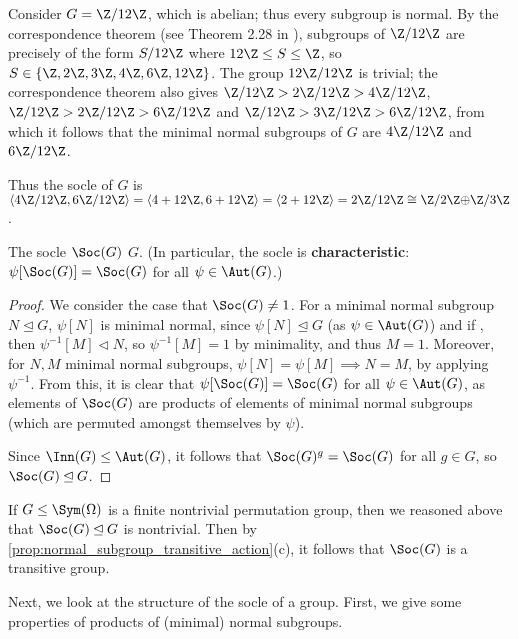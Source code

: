\begin{example}\label{eg:socle_Z_12}
    Consider $G = \Z/12\Z$, which is abelian; thus every subgroup is normal. By the correspondence theorem (see Theorem 2.28 in \cite{rotman_intro_theory_groups1995}), subgroups of $\Z/12\Z$ are precisely of the form $S/12\Z$ where $12\Z \leq S \leq \Z$, so $S \in \{\Z,2\Z,3\Z,4\Z,6\Z,12\Z\}$. The group $12\Z/12\Z$ is trivial; the correspondence theorem also gives $\Z/12\Z > 2\Z/12\Z > 4\Z/12\Z$, $\Z/12\Z > 2\Z/12\Z > 6\Z/12\Z$ and $\Z/12\Z > 3\Z/12\Z > 6\Z/12\Z$, from which it follows that the minimal normal subgroups of $G$ are $4\Z/12\Z$ and $6\Z/12\Z$.

    Thus the socle of $G$ is $\langle 4\Z/12\Z,6\Z/12\Z \rangle = \langle 4 + 12\Z,6 + 12\Z \rangle = \langle 2 + 12\Z \rangle = 2\Z/12\Z \cong \Z/2\Z \added{3}{\oplus} \Z/3\Z$.
\end{example}

\begin{lemma}\label{lem:socle_is_normal}
    The socle $\Soc(G)$  $G$. (In particular, the socle is \textbf{characteristic}: $\psi[\Soc(G)] = \Soc(G)$ for all $\psi \in \Aut(G)$.)
\end{lemma}

\begin{proof}
    We consider the case that $\Soc(G) \neq 1$. For a minimal normal subgroup $N \unlhd G$, $\psi[N]$ is minimal normal, since $\psi[N] \unlhd G$ (as $\psi \in \Aut(G)$) and if , then $\psi^{-1}[M] \lhd N$, so $\psi^{-1}[M] = 1$ by minimality, and thus $M = 1$. Moreover, for $N,M$ minimal normal subgroups, $\psi[N] = \psi[M] \implies N = M$, by applying $\psi^{-1}$. From this, it is clear that $\psi[\Soc(G)] = \Soc(G)$ for all $\psi \in \Aut(G)$, as elements of $\Soc(G)$ are products of elements of minimal normal subgroups (which are permuted amongst themselves by $\psi$).

    Since $\Inn(G) \leq \Aut(G)$, it follows that $\Soc(G)^g = \Soc(G)$ for all $g \in G$, so $\Soc(G) \unlhd G$.
\end{proof}

If $G \leq \Sym(\Omega)$ is a finite nontrivial permutation group, then we reasoned above that $\Soc(G) \unlhd G$ is nontrivial. Then by \autoref{prop:normal_subgroup_transitive_action}(c),  it follows that $\Soc(G)$ is a transitive group.

Next, we look at the structure of the socle of a group. First, we give some properties of products of (minimal) normal subgroups.

